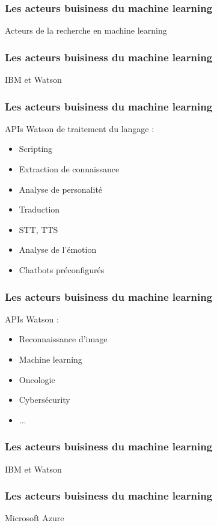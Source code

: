 \documentclass{formation}
\begin{document}
\begin{frame}
  \frametitle{Les acteurs buisiness du machine learning}
  Acteurs de la recherche en machine learning
\end{frame}

\begin{frame}
  \frametitle{Les acteurs buisiness du machine learning}
  IBM et Watson
\end{frame}

\begin{frame}
  \frametitle{Les acteurs buisiness du machine learning}
  APIs Watson de traitement du langage :
  \begin{minipage}[c]{0.49\linewidth}
    \begin{itemize}
    \item Scripting
    \item Extraction de connaissance
    \item Analyse de personalité
    \item Traduction
    \item STT, TTS
    \item Analyse de l'émotion
    \item Chatbots préconfigurés
    \end{itemize}
  \end{minipage}\hfill
  \begin{minipage}[c]{0.49\linewidth}
  \end{minipage}\hfill
\end{frame}

\begin{frame}
  \frametitle{Les acteurs buisiness du machine learning}
  APIs Watson :
  \begin{itemize}
  \item Reconnaissance d'image
  \item Machine learning
  \item Oncologie
  \item Cybersécurity
  \item ...
  \end{itemize}
\end{frame}

\begin{frame}
  \frametitle{Les acteurs buisiness du machine learning}
  IBM et Watson
\end{frame}

\begin{frame}
  \frametitle{Les acteurs buisiness du machine learning}
  Microsoft Azure
\end{frame}
\end{document}
